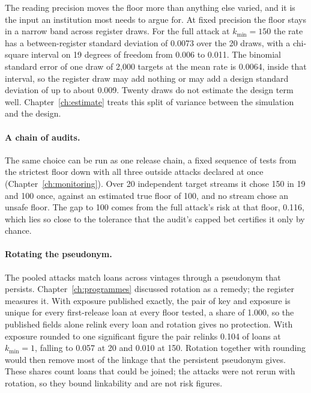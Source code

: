 The reading precision moves the floor more than anything else varied, and it is the
input an institution most needs to argue for. At fixed precision the floor stays in a
narrow band across register draws. For the full attack at $k_{\min}=150$ the rate has a
between-register standard deviation of 0.0073 over the 20 draws, with a chi-square
interval on 19 degrees of freedom from 0.006 to 0.011. The binomial standard error of
one draw of 2{,}000 targets at the mean rate is 0.0064, inside that interval, so the
register draw may add nothing or may add a design standard deviation of up to about
0.009. Twenty draws do not estimate the design term well.
Chapter~\ref{ch:estimate} treats this split of variance between the simulation and
the design.

\paragraph{A chain of audits.} The same choice can be run as one release chain, a
fixed sequence of tests from the strictest floor down with all three outside attacks
declared at once (Chapter~\ref{ch:monitoring}). Over 20 independent target streams it
chose 150 in 19 and 100 once, against an estimated true floor of 100, and no stream
chose an unsafe floor. The gap to 100 comes from the full attack's risk at that floor,
0.116, which lies so close to the tolerance that the audit's capped bet certifies it
only by chance.

\paragraph{Rotating the pseudonym.} The pooled attacks match loans across vintages
through a pseudonym that persists. Chapter~\ref{ch:programmes} discussed rotation as a
remedy; the register measures it. With exposure published exactly, the pair of key
and exposure is unique for every first-release loan at every floor tested, a share of
1.000, so the published fields alone relink every loan and rotation gives no
protection. With exposure rounded to one significant figure the pair relinks 0.104 of
loans at $k_{\min}=1$, falling to 0.057 at 20 and 0.010 at 150.
Rotation together with rounding would then remove most of the linkage that the
persistent pseudonym gives. These shares count loans that could be joined; the attacks
were not rerun with rotation, so they bound linkability and are not risk figures.

